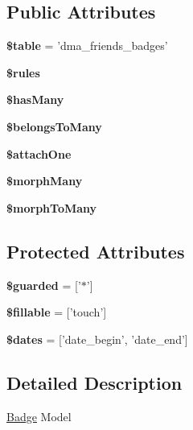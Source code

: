 \subsection*{Public Attributes}
\begin{DoxyCompactItemize}
\item 
\hypertarget{classDMA_1_1Friends_1_1Models_1_1Badge_aa58560300753d15561b1a979aa21b8fd}{{\bfseries \$table} = 'dma\+\_\+friends\+\_\+badges'}\label{classDMA_1_1Friends_1_1Models_1_1Badge_aa58560300753d15561b1a979aa21b8fd}

\item 
{\bfseries \$rules}
\item 
{\bfseries \$has\+Many}
\item 
{\bfseries \$belongs\+To\+Many}
\item 
{\bfseries \$attach\+One}
\item 
{\bfseries \$morph\+Many}
\item 
{\bfseries \$morph\+To\+Many}
\end{DoxyCompactItemize}
\subsection*{Protected Attributes}
\begin{DoxyCompactItemize}
\item 
\hypertarget{classDMA_1_1Friends_1_1Models_1_1Badge_ae0b360f20ce06a26af28c91de3f63e11}{{\bfseries \$guarded} = \mbox{[}'$\ast$'\mbox{]}}\label{classDMA_1_1Friends_1_1Models_1_1Badge_ae0b360f20ce06a26af28c91de3f63e11}

\item 
\hypertarget{classDMA_1_1Friends_1_1Models_1_1Badge_a4d4f326e6071e6d44fdb54d93d579c44}{{\bfseries \$fillable} = \mbox{[}'touch'\mbox{]}}\label{classDMA_1_1Friends_1_1Models_1_1Badge_a4d4f326e6071e6d44fdb54d93d579c44}

\item 
\hypertarget{classDMA_1_1Friends_1_1Models_1_1Badge_ae8aa2206bbd9a6e152db7691a0dfd0b5}{{\bfseries \$dates} = \mbox{[}'date\+\_\+begin', 'date\+\_\+end'\mbox{]}}\label{classDMA_1_1Friends_1_1Models_1_1Badge_ae8aa2206bbd9a6e152db7691a0dfd0b5}

\end{DoxyCompactItemize}


\subsection{Detailed Description}
\hyperlink{classDMA_1_1Friends_1_1Models_1_1Badge}{Badge} Model 

